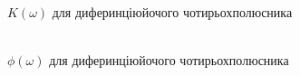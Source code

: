 \begin{figure}[h]
	\begin{minipage}[h]{0.47\linewidth}
		 \\$K(\omega)$ для диферинціюйочого чотирьохполюсника
	\end{minipage}
	\hfill
	\begin{minipage}[h]{0.47\linewidth}
		 \\$\phi(\omega)$ для диферинціюйочого чотирьохполюсника
	\end{minipage}
	\vfill
	\begin{minipage}[h]{0.47\linewidth}

\end{minipage}
\end{figure}
